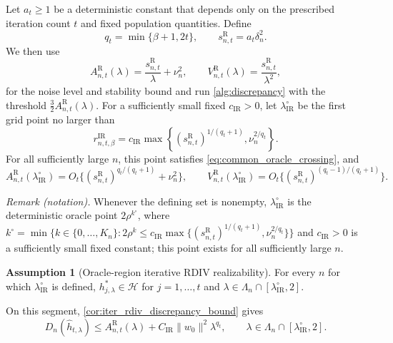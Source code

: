 \documentclass[12pt]{article}
\theoremstyle{plain}
\theoremstyle{definition}
\newtheorem{assumption}[theorem]{Assumption}
\theoremstyle{remark}
\begin{document}
Let $a_t\geqslant1$ be a deterministic constant that depends only on the
prescribed iteration count $t$ and fixed population quantities. Define
\[
q_t=\min\{\beta+1,2t\}, \qquad s_{n,t}^{\mathrm R}=a_t\delta_n^2.
\]
We then use 
\begin{equation}\label{eq:iter_rdiv_common_scales}
A_{n,t}^{\mathrm R}(\lambda)=\frac{s_{n,t}^{\mathrm R}}{\lambda}+\nu_n^2,
\qquad
V_{n,t}^{\mathrm R}(\lambda)=\frac{s_{n,t}^{\mathrm R}}{\lambda^2},
\end{equation}
for the noise level and stability bound and run \cref{alg:discrepancy} with the threshold $\tfrac32A_{n,t}^{\mathrm R}(\lambda)$.
For a sufficiently small fixed $c_{\mathrm{IR}}>0$, let
$\lambda_{\mathrm{IR}}^\circ$ be the first grid point no larger than
\[
r_{n,t,\beta}^{\mathrm{IR}}
=c_{\mathrm{IR}}\max\left\{
(s_{n,t}^{\mathrm R})^{1/(q_t+1)},\nu_n^{2/q_t}
\right\}.
\]
For all sufficiently large $n$, this point satisfies
\eqref{eq:common_oracle_crossing}, and
\begin{equation}\label{eq:iter_rdiv_oracle_scales}
A_{n,t}^{\mathrm R}(\lambda_{\mathrm{IR}}^\circ)=O_t\{(s_{n,t}^{\mathrm R})^{q_t/(q_t+1)}+\nu_n^2\},
\qquad
V_{n,t}^{\mathrm R}(\lambda_{\mathrm{IR}}^\circ)=O_t\{(s_{n,t}^{\mathrm R})^{(q_t-1)/(q_t+1)}\}.
\end{equation}

\noindent\textit{Remark (notation).} Whenever the defining set is nonempty, $\lambda_{\mathrm{IR}}^\circ$ is the deterministic oracle point $2\rho^{k^\circ}$, where $k^\circ=\min\{k\in\{0,\ldots,K_n\}:2\rho^k\leqslant c_{\mathrm{IR}}\max\{(s_{n,t}^{\mathrm R})^{1/(q_t+1)},\nu_n^{2/q_t}\}\}$ and $c_{\mathrm{IR}}>0$ is a sufficiently small fixed constant; this point exists for all sufficiently large $n$.


\begin{assumption}[Oracle-region iterative RDIV realizability]\label{asp:iter_realizability_rdiv}
For every $n$ for which $\lambda_{\mathrm{IR}}^\circ$ is defined,
$h_{j,\lambda}^*\in\mathcal H$ for $j=1,\ldots,t$ and
$\lambda\in\Lambda_n\cap[\lambda_{\mathrm{IR}}^\circ,2]$.
\end{assumption}
On this segment, \cref{cor:iter_rdiv_discrepancy_bound} gives
\begin{equation}\label{eq:iter_rdiv_discrepancy_bound}
D_n(\hat h_{t,\lambda})
\leqslant
A_{n,t}^{\mathrm R}(\lambda)
+C_{\mathrm{IR}}\|w_0\|^2\lambda^{q_t},
\qquad
\lambda\in\Lambda_n\cap[\lambda_{\mathrm{IR}}^\circ,2].
\end{equation}
\end{document}
